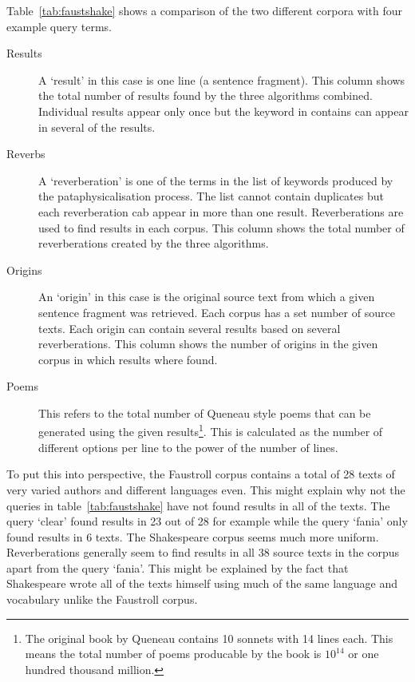 Table~\ref{tab:faustshake} shows a comparison of the two different corpora with four example query terms.

\begin{description}
  \item[Results] A `result' in this case is one line (a sentence fragment). This column shows the total number of results found by the three algorithms combined. Individual results appear only once but the keyword in contains can appear in several of the results.
  \item[Reverbs] A `reverberation' is one of the terms in the list of keywords produced by the pataphysicalisation process. The list cannot contain duplicates but each reverberation cab appear in more than one result. Reverberations are used to find results in each corpus. This column shows the total number of reverberations created by the three algorithms.
  \item[Origins] An `origin' in this case is the original source text from which a given sentence fragment was retrieved. Each corpus has a set number of source texts. Each origin can contain several results based on several reverberations. This column shows the number of origins in the given corpus in which results where found.
  \item[Poems] This refers to the total number of Queneau style poems that can be generated using the given results\footnote{The original book by Queneau contains 10 sonnets with 14 lines each. This means the total number of poems producable by the book is $10^{14}$ or one hundred thousand million.}. This is calculated as the number of different options per line to the power of the number of lines.
\end{description}

To put this into perspective, the Faustroll corpus contains a total of 28 texts of very varied authors and different languages even. This might explain why not the queries in table~\ref{tab:faustshake} have not found results in all of the texts. The query `clear' found results in 23 out of 28 for example while the query `fania' only found results in 6 texts. The Shakespeare corpus seems much more uniform. Reverberations generally seem to find results in all 38 source texts in the corpus apart from the query `fania'. This might be explained by the fact that Shakespeare wrote all of the texts himself using much of the same language and vocabulary unlike the Faustroll corpus. 

